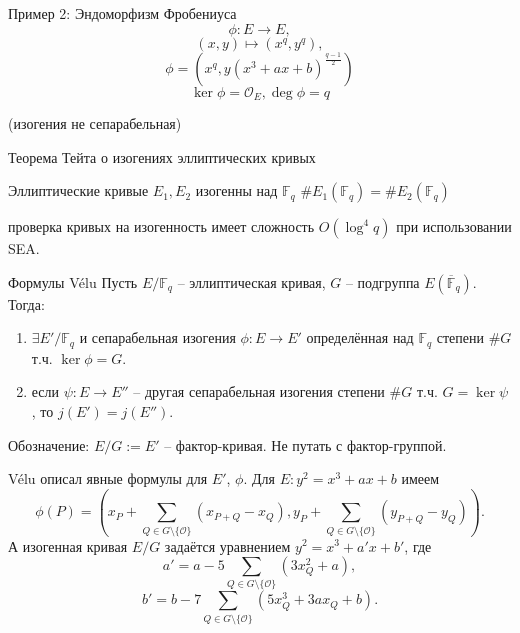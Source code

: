 \documentclass{beamer}
\begin{document}
\begin{frame}{Пример 2: Эндоморфизм Фробениуса}
\[\phi: E \rightarrow E,\]
\[(x,y) \mapsto (x^q, y^q),\]
\[
\phi = (x^q, y (x^3 + a x + b)^{\frac{q-1}{2}})
\]
\[
\ker{\phi} = \mathcal{O}_E, \deg{\phi} = q
\]
\begin{center}
(изогения не сепарабельная)
\end{center}
\end{frame}

\begin{frame}{Теорема Тейта о изогениях эллиптических кривых}
	\begin{center}
		Эллиптические кривые $E_1, E_2$ изогенны над $\mathbb{F}_q$ \structure{$\iff$} $\#E_1(\mathbb{F}_q) = \#E_2(\mathbb{F}_q)$
	\end{center}
		 проверка кривых на изогенность имеет сложность $O(\log^4{q})$ при использовании SEA.
\end{frame}

\begin{frame}{Формулы V\'{e}lu}
Пусть $E/\mathbb{F}_q$ -- эллиптическая кривая, $G$ -- подгруппа $E(\overline{\mathbb{F}}_q)$. Тогда:
\begin{enumerate}
    \item $\exists E'/\mathbb{F}_q$ и сепарабельная изогения $\phi: E \rightarrow E'$ определённая над $\mathbb{F}_q$ степени $\#G$ т.ч. $\ker\phi = G$.
    \item если $\psi: E \rightarrow E''$ -- другая сепарабельная изогения степени $\#G$ т.ч. $G = \ker\psi$, то $j(E') = j(E'')$.
\end{enumerate}
Обозначение: $E/G := E'$ -- фактор-кривая. Не путать с фактор-группой.
\end{frame}

\begin{frame}
V\'{e}lu описал явные формулы для $E'$, $\phi$. Для $E: y^2 = x^3 + a x + b$ имеем
\[
\phi(P)
=
\left(
  x_P + \sum_{Q \in G \setminus \{\mathcal{O}\}} \left( x_{P+Q} - x_Q \right),
  y_P + \sum_{Q \in G \setminus \{ \mathcal{O} \}} \left( y_{P+Q} - y_Q \right)
\right).
\]
А изогенная кривая $E/G$ задаётся уравнением $y^2 = x^3 + a' x + b'$, где
\[
a' = a - 5 \sum_{Q \in G \setminus \{ \mathcal{O} \}} \left( 3 x_Q^2 + a \right),
\]
\[
b' = b - 7 \sum_{Q \in G \setminus \{\mathcal{O}\}} \left(
5 x_Q^3 + 3 a x_Q + b
\right).
\]
\end{frame}
\end{document}

